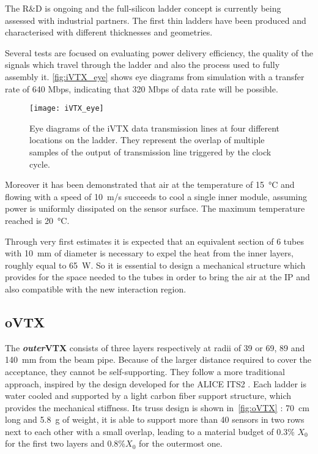 The R\&D is ongoing and the full-silicon ladder concept is currently being assessed with industrial partners. The first thin ladders have been produced and characterised with different thicknesses and geometries.

Several tests are focused on evaluating power delivery efficiency, the quality of the signals which travel through the ladder and also the process used to fully assembly it. 
\autoref{fig:iVTX_eye} shows eye diagrams from simulation with a transfer rate of 640 Mbps, indicating that 320 Mbps of data rate will be possible.

\begin{figure}[h!]
\centering
\texttt{[image: iVTX\_eye]}
\caption{Eye diagrams of the iVTX data transmission lines at four different locations on the ladder. They represent the overlap of multiple samples of the output of transmission line triggered by the clock cycle.}
\label{fig:iVTX_eye}
\end{figure}

Moreover it has been demonstrated that air at the temperature of \SI{15}{\degreeCelsius} and flowing with a speed of \SI{10}{m/s} succeeds to cool a single inner module, assuming power is uniformly dissipated on the sensor surface. The maximum temperature reached is \SI{20}{\degreeCelsius}. 

Through very first estimates it is expected that an equivalent section of 6 tubes with \SI{10}{mm} of diameter is necessary to expel the heat from the inner layers, roughly equal to \SI{65}{W}. So it is essential to design a mechanical structure which provides for the space needed to the tubes in order to bring the air at the IP and also compatible with the new interaction region.


\subsection{oVTX} \label{sec:oVTX}

The \textbf{\textit{outer}VTX} consists of three layers respectively at radii of 39 or 69, 89 and \SI{140}{mm} from the beam pipe. Because of the larger distance required to cover the acceptance, they cannot be self-supporting. They follow a more traditional approach, inspired by the design developed for the ALICE ITS2 \cite{Fantoni:2020iyr}. Each ladder is water cooled and supported by a light carbon fiber support structure, which provides the mechanical stiffness. Its truss design is shown in~\autoref{fig:oVTX} : \SI{70}{cm} long and \SI{5.8}{g} of weight, it is able to support more than 40 sensors in two rows next to each other with a small overlap, leading to a material budget of 0.3\% $X_{0}$ for the first two layers and 0.8\%$X_{0}$  for the outermost one.

